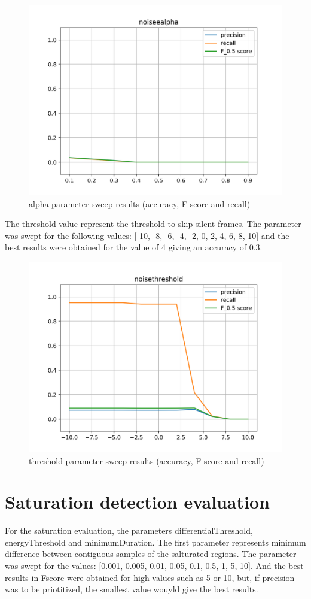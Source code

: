 \begin{figure}[H]
	\includegraphics[clip,width=0.7\columnwidth]{Figures/noiseealpha.png}%
	\caption{alpha parameter sweep results (accuracy, F score and recall)}
	\label{fig:noiseealpha}
\end{figure}

The threshold value represent the threshold to skip silent frames. The parameter was swept for the following values: [-10, -8, -6, -4, -2, 0, 2, 4, 6, 8, 10] and the best results were obtained for the value of 4 giving an accuracy of 0.3.

\begin{figure}[H]
	\includegraphics[clip,width=0.7\columnwidth]{Figures/noisethreshold.png}%
	\caption{threshold parameter sweep results (accuracy, F score and recall)}
	\label{fig:noisethreshold}
\end{figure}

\section{Saturation detection evaluation}
For the saturation evaluation, the parameters differentialThreshold, energyThreshold and minimumDuration. The first parameter represents minimum difference between contiguous samples of the salturated regions. The parameter was swept for the values: [0.001, 0.005, 0.01, 0.05, 0.1, 0.5, 1, 5, 10]. And the best results in Fscore were obtained for high values such as 5 or 10, but, if precision was to be priotitized, the smallest value wouyld give the best results. 

